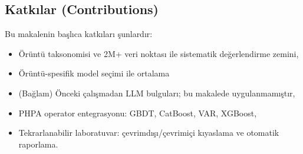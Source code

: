 \subsection{Katkılar (Contributions)}

Bu makalenin başlıca katkıları şunlardır:

\begin{itemize}[noitemsep]
  \item Örüntü taksonomisi ve 2M+ veri noktası ile sistematik değerlendirme zemini,
  \item Örüntü-spesifik model seçimi ile ortalama %
  \item (Bağlam) Önceki çalışmadan LLM bulguları; bu makalede uygulanmamıştır,
  \item PHPA operator entegrasyonu: GBDT, CatBoost, VAR, XGBoost,
  \item Tekrarlanabilir laboratuvar: çevrimdışı/çevrimiçi kıyaslama ve otomatik raporlama.
\end{itemize}
